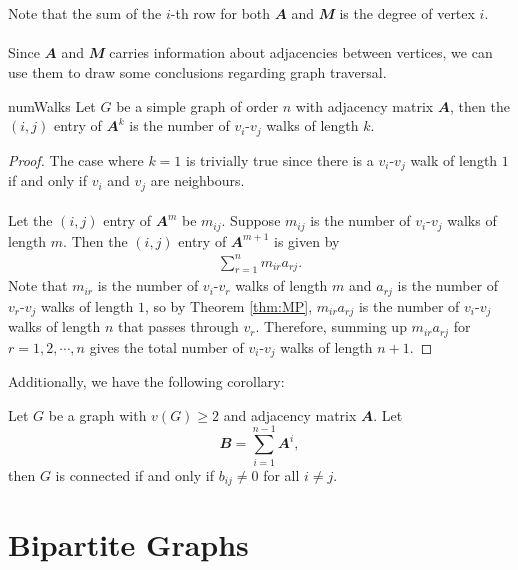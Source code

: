 \documentclass[math]{amznotes}
\theoremstyle{remark}
\begin{document}
\\\\
Note that the sum of the $i$-th row for both $\mathbfit{A}$ and $\mathbfit{M}$ is the degree of vertex $i$. 
\\\\
Since $\mathbfit{A}$ and $\mathbfit{M}$ carries information about adjacencies between vertices, we can use them to draw some conclusions regarding graph traversal.
\begin{probox}{}{numWalks}
    Let $G$ be a simple graph of order $n$ with adjacency matrix $\mathbfit{A}$, then the $(i, j)$ entry of $\mathbfit{A}^k$ is the number of $v_i$-$v_j$ walks of length $k$.
    \tcblower   
    \begin{proof}
        The case where $k = 1$ is trivially true since there is a $v_i$-$v_j$ walk of length $1$ if and only if $v_i$ and $v_j$ are neighbours.
        \\\\
        Let the $(i, j)$ entry of $\mathbfit{A}^m$ be $m_{ij}$. Suppose $m_{ij}$ is the number of $v_i$-$v_j$ walks of length $m$. Then the $(i, j)$ entry of $\mathbfit{A}^{m + 1}$ is given by
        \begin{align*}
            \sum_{r = 1}^{n}m_{ir}a_{rj}.
        \end{align*}
        Note that $m_{ir}$ is the number of $v_i$-$v_r$ walks of length $m$ and $a_{rj}$ is the number of $v_r$-$v_j$ walks of length $1$, so by Theorem \ref{thm:MP}, $m_{ir}a_{rj}$ is the number of $v_i$-$v_j$ walks of length $n$ that passes through $v_r$. Therefore, summing up $m_{ir}a_{rj}$ for $r = 1, 2, \cdots, n$ gives the total number of $v_i$-$v_j$ walks of length $n + 1$.
    \end{proof}
\end{probox}
Additionally, we have the following corollary:
\begin{corbox}{}{}
    Let $G$ be a graph with $v(G) \geq 2$ and adjacency matrix $\mathbfit{A}$. Let
    \begin{equation*}
        \mathbfit{B} = \sum_{i = 1}^{n - 1}\mathbfit{A}^i,
    \end{equation*}
    then $G$ is connected if and only if $b_{ij} \neq 0$ for all $i \neq j$.
\end{corbox}

\chapter{Bipartite Graphs}
\end{document}

